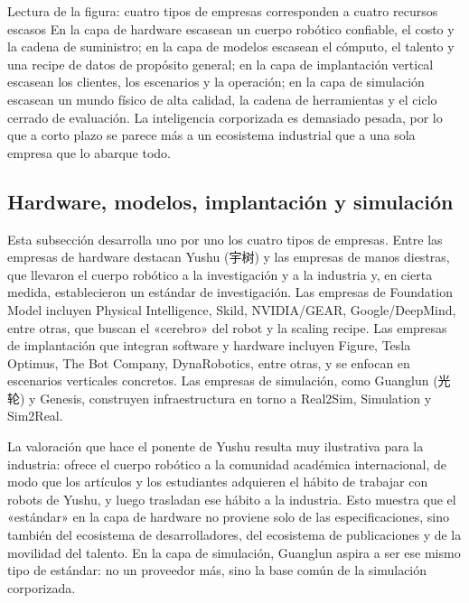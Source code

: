 \documentclass[a4paper]{article}
\begin{document}
\begin{knowledgebox}{Lectura de la figura: cuatro tipos de empresas corresponden a cuatro recursos escasos}
En la capa de hardware escasean un cuerpo robótico confiable, el costo y la cadena de suministro; en la capa de modelos escasean el cómputo, el talento y una recipe de datos de propósito general; en la capa de implantación vertical escasean los clientes, los escenarios y la operación; en la capa de simulación escasean un mundo físico de alta calidad, la cadena de herramientas y el ciclo cerrado de evaluación. La inteligencia corporizada es demasiado pesada, por lo que a corto plazo se parece más a un ecosistema industrial que a una sola empresa que lo abarque todo.
\end{knowledgebox}

\subsection{Hardware, modelos, implantación y simulación}

Esta subsección desarrolla uno por uno los cuatro tipos de empresas. Entre las empresas de hardware destacan Yushu (宇树) y las empresas de manos diestras, que llevaron el cuerpo robótico a la investigación y a la industria y, en cierta medida, establecieron un estándar de investigación. Las empresas de Foundation Model incluyen Physical Intelligence, Skild, NVIDIA/GEAR, Google/DeepMind, entre otras, que buscan el «cerebro» del robot y la scaling recipe. Las empresas de implantación que integran software y hardware incluyen Figure, Tesla Optimus, The Bot Company, DynaRobotics, entre otras, y se enfocan en escenarios verticales concretos. Las empresas de simulación, como Guanglun (光轮) y Genesis, construyen infraestructura en torno a Real2Sim, Simulation y Sim2Real.

La valoración que hace el ponente de Yushu resulta muy ilustrativa para la industria: ofrece el cuerpo robótico a la comunidad académica internacional, de modo que los artículos y los estudiantes adquieren el hábito de trabajar con robots de Yushu, y luego trasladan ese hábito a la industria. Esto muestra que el «estándar» en la capa de hardware no proviene solo de las especificaciones, sino también del ecosistema de desarrolladores, del ecosistema de publicaciones y de la movilidad del talento. En la capa de simulación, Guanglun aspira a ser ese mismo tipo de estándar: no un proveedor más, sino la base común de la simulación corporizada.
\end{document}
